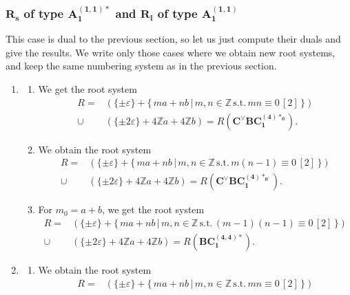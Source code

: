 \documentclass[11pt]{amsart}
\newcommand{\Z}{\mathbb{Z}}
\newcommand{\vep}{\varepsilon}
\begin{document}

\subsubsection{$\mathbf{R_s}$ of type $\mathbf{A_1^{(1,1)\ast}}$ and $\mathbf{R_l}$  of type $\mathbf{A_1^{(1,1)}}$}
This case is dual to the previous section, so let us just compute their duals and give the results. We write only those cases where we obtain new root systems, and keep the same numbering system as in the previous section. 

\begin{enumerate}
\item 
\begin{enumerate}
\item[(I)] We get the root system 
\begin{align*}
R=
&(\{ \pm\vep \}+\{\, ma+nb\, \vert\, m,n \in \Z\, \text{s.t.}\, mn \equiv 0\, [2]\, \})\\
\cup 
&(\{ \pm 2\vep \}+4\Z a+4\Z b) = R(\mathbf{C^\vee BC_1^{(4)\ast_0}}).
\end{align*}
\item[(III)] We obtain the root system 
\begin{align*}
R=
 &(\{ \pm\vep \}+\{\, ma+nb\, \vert\, m,n \in \Z\, \text{s.t.}\, m(n-1) \equiv 0\, [2]\, \})\\
\cup 
&(\{ \pm 2\vep \}+4\Z a+4\Z b) = R(\mathbf{C^\vee BC_1^{(4)\ast_{0'}}}).
\end{align*}
\item[(IV)] For $m_0=a+b$, we  get the root system 
\begin{align*}
R=
 &(\{ \pm\vep \}+\{\, ma+nb\, \vert\, m,n \in \Z\, \text{s.t.}\, (m-1)(n-1) \equiv 0\, [2]\, \})\\
\cup 
&(\{ \pm 2\vep \}+4\Z a+4\Z b) = R(\mathbf{BC_1^{(4,4)\ast}}).
\end{align*}
\end{enumerate}
\item 
\begin{enumerate}
\item[(I)] We obtain the root system 
\begin{align*}
R=
 &(\{ \pm\vep \}+\{\, ma+nb\, \vert\, m,n \in \Z\, \text{s.t.}\, mn \equiv 0\, [2]\, \})\\

\end{align*}
\end{enumerate}
\end{enumerate}
\end{document}
